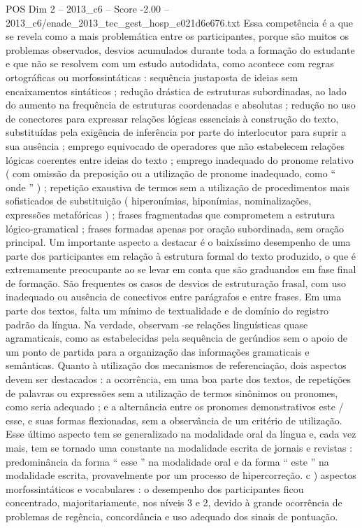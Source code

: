 \begin{textsample}{POS Dim 2 – 2013\_c6 – Score -2.00 – 2013\_c6/enade\_2013\_tec\_gest\_hosp\_e021d6e676.txt}
Essa competência é a que se revela como a mais problemática entre os participantes, porque são muitos os problemas observados, desvios acumulados durante toda a formação do estudante e que não se resolvem com um estudo autodidata, como acontece com regras ortográficas ou morfossintáticas : sequência justaposta de ideias sem encaixamentos sintáticos ; redução drástica de estruturas subordinadas, ao lado do aumento na frequência de estruturas coordenadas e absolutas ; redução no uso de conectores para expressar relações lógicas essenciais à construção do texto, substituídas pela exigência de inferência por parte do interlocutor para suprir a sua ausência ; emprego equivocado de operadores que não estabelecem relações lógicas coerentes entre ideias do texto ; emprego inadequado do pronome relativo ( com omissão da preposição ou a utilização de pronome inadequado, como “ onde ” ) ; repetição exaustiva de termos sem a utilização de procedimentos mais sofisticados de substituição ( hiperonímias, hiponímias, nominalizações, expressões metafóricas ) ; frases fragmentadas que comprometem a estrutura lógico-gramatical ; frases formadas apenas por oração subordinada, sem oração principal.
Um importante aspecto a destacar é o baixíssimo desempenho de uma parte dos participantes em relação à estrutura formal do texto produzido, o que é extremamente preocupante ao se levar em conta que são graduandos em fase final de formação.
São frequentes os casos de desvios de estruturação frasal, com uso inadequado ou ausência de conectivos entre parágrafos e entre frases.
Em uma parte dos textos, falta um mínimo de textualidade e de domínio do registro padrão da língua.
Na verdade, observam -se relações linguísticas quase agramaticais, como as estabelecidas pela sequência de gerúndios sem o apoio de um ponto de partida para a organização das informações gramaticais e semânticas.
Quanto à utilização dos mecanismos de referenciação, dois aspectos devem ser destacados : a ocorrência, em uma boa parte dos textos, de repetições de palavras ou expressões sem a utilização de termos sinônimos ou pronomes, como seria adequado ; e a alternância entre os pronomes demonstrativos este / esse, e suas formas flexionadas, sem a observância de um critério de utilização.
Esse último aspecto tem se generalizado na modalidade oral da língua e, cada vez mais, tem se tornado uma constante na modalidade escrita de jornais e revistas : predominância da forma “ esse ” na modalidade oral e da forma “ este ” na modalidade escrita, provavelmente por um processo de hipercorreção. c ) aspectos morfossintáticos e vocabulares : o desempenho dos participantes ficou concentrado, majoritariamente, nos níveis 3 e 2, devido à grande ocorrência de problemas de regência, concordância e uso adequado dos sinais de pontuação.

\end{textsample}
